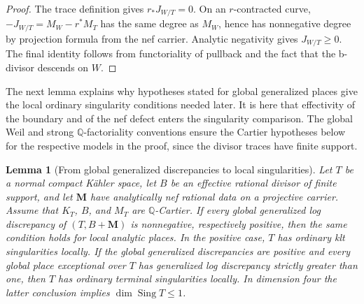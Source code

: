 \documentclass[11pt]{amsart}
\newtheorem{lemma}[theorem]{Lemma}
\theoremstyle{definition}
\theoremstyle{remark}
\numberwithin{equation}{section}
\newcommand{\Q}{\mathbb{Q}}
\newcommand{\M}{\mathbf{M}}
\DeclareMathOperator{\Sing}{Sing}
\begin{document}
\begin{proof}
The trace definition gives $r_*J_{W/T}=0$.  On an $r$-contracted curve,
$-J_{W/T}=M_W-r^*M_T$ has the same degree as $M_W$, hence has
nonnegative degree by projection formula from the nef carrier.
Analytic negativity gives $J_{W/T}\geq0$.
The final identity follows from functoriality of pullback and the fact
that the b-divisor descends on $W$.
\end{proof}

The next lemma explains why hypotheses stated for global generalized
places give the local ordinary singularity conditions needed later.
It is here that effectivity of the boundary and of the nef defect
enters the singularity comparison.  The global Weil and strong
$\Q$-factoriality conventions ensure the Cartier hypotheses below for
the respective models in the proof, since the divisor traces have
finite support.

\begin{lemma}[From global generalized discrepancies to local singularities]
\label{lem:ordinary-singularities}
Let $T$ be a normal compact K\"ahler space, let $B$ be an effective
rational divisor of finite support, and let $\M$ have analytically nef
rational data on a projective carrier.  Assume that $K_T$, $B$, and
$M_T$ are $\Q$-Cartier.
If every global generalized log discrepancy of $(T,B+\M)$ is
nonnegative, respectively positive, then the same condition holds for
local analytic places.  In the positive case, $T$ has ordinary klt
singularities locally.  If the global generalized discrepancies are
positive and every global place exceptional over $T$ has generalized
log discrepancy strictly greater than one,
then $T$ has ordinary terminal singularities locally.  In dimension
four the latter conclusion implies $\dim\Sing T\leq1$.
\end{lemma}
\end{document}
